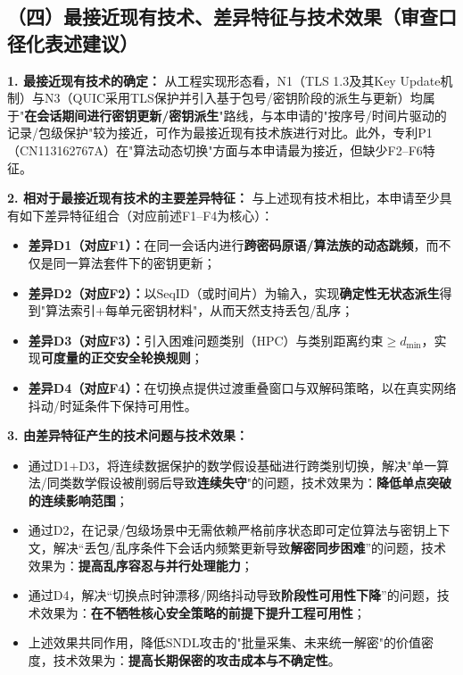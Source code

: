 \documentclass[12pt,a4paper]{article}
\begin{document}
\subsection*{（四）最接近现有技术、差异特征与技术效果（审查口径化表述建议）}

\textbf{1. 最接近现有技术的确定：}
从工程实现形态看，N1（TLS 1.3及其Key Update机制）与N3（QUIC采用TLS保护并引入基于包号/密钥阶段的派生与更新）均属于"\textbf{在会话期间进行密钥更新/密钥派生}"路线，与本申请的"按序号/时间片驱动的记录/包级保护"较为接近，可作为最接近现有技术族进行对比。此外，专利P1（CN113162767A）在"算法动态切换"方面与本申请最为接近，但缺少F2--F6特征。

\textbf{2. 相对于最接近现有技术的主要差异特征：}
与上述现有技术相比，本申请至少具有如下差异特征组合（对应前述F1--F4为核心）：
\begin{itemize}[leftmargin=2em]
    \item \textbf{差异D1（对应F1）：}在同一会话内进行\textbf{跨密码原语/算法族的动态跳频}，而不仅是同一算法套件下的密钥更新；
    \item \textbf{差异D2（对应F2）：}以$\text{SeqID}$（或时间片）为输入，实现\textbf{确定性无状态派生}得到"算法索引+每单元密钥材料"，从而天然支持丢包/乱序；
    \item \textbf{差异D3（对应F3）：}引入困难问题类别（HPC）与类别距离约束$\ge d_{\min}$，实现\textbf{可度量的正交安全轮换规则}；
    \item \textbf{差异D4（对应F4）：}在切换点提供过渡重叠窗口与双解码策略，以在真实网络抖动/时延条件下保持可用性。
\end{itemize}

\textbf{3. 由差异特征产生的技术问题与技术效果：}
\begin{itemize}[leftmargin=2em]
    \item 通过D1+D3，将连续数据保护的数学假设基础进行跨类别切换，解决"单一算法/同类数学假设被削弱后导致\textbf{连续失守}"的问题，技术效果为：\textbf{降低单点突破的连续影响范围}；
    \item 通过D2，在记录/包级场景中无需依赖严格前序状态即可定位算法与密钥上下文，解决“丢包/乱序条件下会话内频繁更新导致\textbf{解密同步困难}”的问题，技术效果为：\textbf{提高乱序容忍与并行处理能力}；
    \item 通过D4，解决“切换点时钟漂移/网络抖动导致\textbf{阶段性可用性下降}”的问题，技术效果为：\textbf{在不牺牲核心安全策略的前提下提升工程可用性}；
    \item 上述效果共同作用，降低SNDL攻击的"批量采集、未来统一解密"的价值密度，技术效果为：\textbf{提高长期保密的攻击成本与不确定性}。
\end{itemize}
\end{document}
